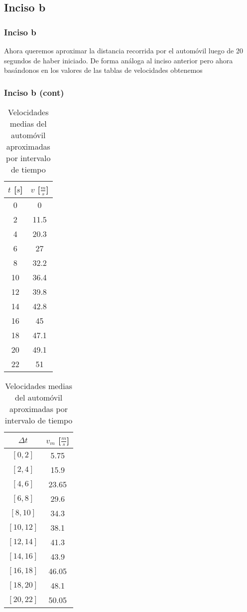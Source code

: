 \documentclass[11pt]{beamer}
\begin{document}
	\subsection{Inciso b}
	\begin{frame}
		\frametitle{Inciso b}
		
		Ahora queremos aproximar la distancia recorrida por el automóvil luego de 20 segundos de haber iniciado. De forma análoga al inciso anterior pero ahora basándonos en los valores de las tablas de velocidades obtenemos
	\end{frame}

	\begin{frame}
		\frametitle{Inciso b (cont)}
		
		\begin{table}[H]
			\centering
			\begin{tabular}{|c|c|}
				\hline
				$t$ [$s$] & $v$ [$\frac{m}{s}$]\\
				\hline
				0&0\\
				\hline
				2&11.5\\
				\hline
				4&20.3\\
				\hline
				6&27\\
				\hline
				8&32.2\\
				\hline
				10&36.4\\
				\hline
				12&39.8\\
				\hline
				14&42.8\\
				\hline
				16&45\\
				\hline
				18&47.1\\
				\hline
				20&49.1\\
				\hline
				22&51\\
				\hline
			\end{tabular}
			\qquad
			\begin{tabular}{|c|c|}
				\hline
				$\Delta t$ & $v_{m}$ [$\frac{m}{s}$]\\
				\hline
				$[0,2]$&5.75\\
				\hline
				$[2,4]$&15.9\\
				\hline
				$[4,6]$&23.65\\
				\hline
				$[6,8]$&29.6\\
				\hline
				$[8,10]$&34.3\\
				\hline
				$[10,12]$&38.1\\
				\hline
				$[12,14]$&41.3\\
				\hline
				$[14,16]$&43.9\\
				\hline
				$[16,18]$&46.05\\
				\hline
				$[18,20]$&48.1\\
				\hline
				$[20,22]$&50.05\\
				\hline
			\end{tabular}
			\caption{Velocidades medias del automóvil aproximadas por intervalo de tiempo}
			\label{tab:Posiciones}
		\end{table}
	\end{frame}
\end{document}
